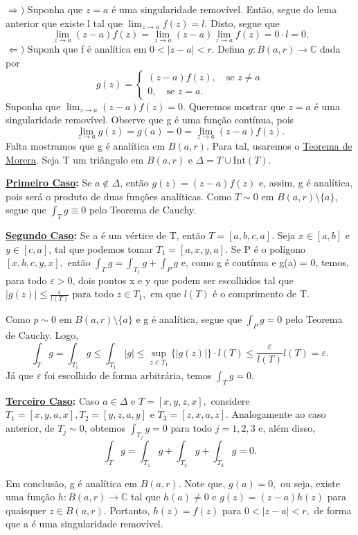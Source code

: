 \documentclass[ComplexAnalysis/complex.tex]{subfiles}
\begin{document}
\begin{proof*}
	\(\Rightarrow )\) Suponha que \(z=a\) é uma singularidade removível. Então, segue do lema anterior que existe l tal que \(\lim_{z\to a}f(z) = l.\) Disto, segue que
	\[
		\lim_{z\to a}(z-a)f(z) = \lim_{z\to a}(z-a)\lim_{z\to a}f(z) = 0 \cdot l = 0.
	\]
	\(\Leftarrow )\) Suponh que f é analítica em \(0 < |z-a| < r.\) Defina \(g:B(a, r)\rightarrow \mathbb{C}\) dada por
	\[
		g(z) = \left\{\begin{array}{ll}
			(z-a)f(z),\quad \text{se }z\neq a \\
			0,\quad \text{se }z=a.
		\end{array}\right.
	\]
	Suponha que \(\lim_{z\to a}(z-a)f(z) = 0\). Queremos mostrar que \(z = a\) é uma singularidade removível.
	Observe que g é uma função contínua, pois
	\[
		\lim_{z\to a}g(z) = g(a) = 0 = \lim_{z\to a}(z-a)f(z).
	\]
	Falta mostramos que g é analítica em \(B(a, r)\). Para tal, usaremos o \hyperlink{morera}{Teorema de Morera}.
	Seja T um triângulo em \(B(a, r)\) e \(\Delta = T\cup \mathrm{Int}(T)\).

	\textbf{\underline{Primeiro Caso}:} Se \(a\not\in \Delta \), então \(g(z) = (z-a)f(z)\) e, assim, g é analítica, pois
	será o produto de duas funções analíticas. Como \(T\sim 0\) em \(B(a, r)\setminus{\{a\}}\), segue que \(\int_{T}^{}g\equiv 0\) pelo
	Teorema de Cauchy.

	\textbf{\underline{Segundo Caso}:} Se a é um vértice de T, então \(T = [a, b, c, a].\) Seja \(x\in [a, b]\) e \(y\in [c, a]\), tal que
	podemos tomar \(T_{1} = [a, x, y, a].\) Se P é o polígono \([x, b, c, y, x],\) então \(\int_{T}^{}g = \int_{T_{1}}^{}g + \int_{P}^{}g\) e, como g
	é contínua e g(a) = 0, temos, para todo \(\varepsilon > 0\), dois pontos x e y que podem ser escolhidos tal que \(|g(z)| \leq \frac{\varepsilon }{l(T)}\)
	para todo \(z\in T_{1},\) em que \(l(T)\) é o comprimento de T.

	Como \(p\sim 0\) em \(B(a, r)\setminus{\{a\}}\) e g é analítica, segue que \(\int_{P}^{}g = 0\) pelo Teorema de Cauchy. Logo,
	\[
		\int_{T}^{}g = \int_{T_{1}}^{} g \leq \int_{T_{1}}^{}|g| \leq \sup_{z\in T_{1}}\{|g(z)|\}\cdot l(T) \leq \frac{\varepsilon }{l(T)}l(T) = \varepsilon .
	\]
	Já que \(\varepsilon \) foi escolhido de forma arbitrária, temos \(\int_{T}^{}g = 0.\)

	\textbf{\underline{Terceiro Caso}:} Caso \(a\in \Delta \) e \(T = [x, y, z, x],\) considere \(T_{1} = [x, y, a, x], T_{2} = [y, z, a, y]\) e \(T_{3} = [z, x, a, z].\)
	Analogamente ao caso anterior, de \(T_{j}\sim 0\), obtemos \(\int_{T_{j}}^{}g = 0\) para todo \(j = 1, 2, 3\) e, além disso,
	\[
		\int_{T}^{}g = \int_{T_{1}}^{}g + \int_{T_{2}}^{} g + \int_{T_{3}}^{}g = 0.
	\]

	Em conclusão, g é analítica em \(B(a, r).\) Note que, \(g(a) = 0,\) ou seja, existe uma função \(h:B(a, r)\rightarrow \mathbb{C}\) tal que \(h(a)\neq0\) e \(g(z) = (z-a)h(z)\)
	para quaisquer \(z\in B(a, r).\) Portanto, \(h(z) = f(z)\) para \(0 < |z-a| < r,\) de forma que a é uma singularidade removível. \qedsymbol
\end{proof*}
\end{document}
